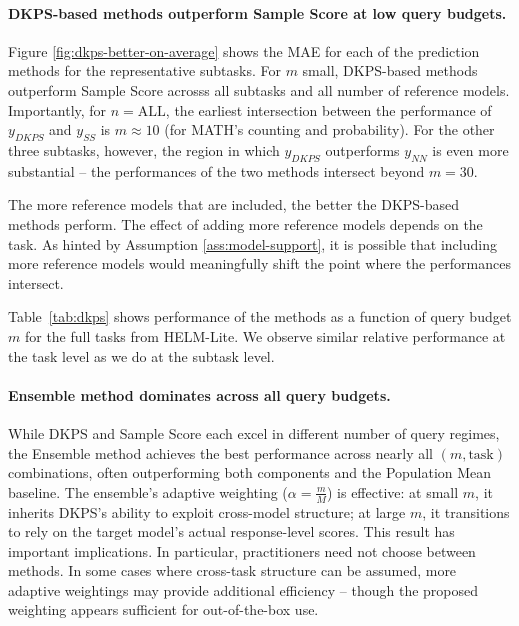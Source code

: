 \paragraph{DKPS-based methods outperform Sample Score at low query budgets.}
Figure \ref{fig:dkps-better-on-average} shows the MAE for each of the prediction methods for the representative subtasks.
For $ m $ small, DKPS-based methods outperform Sample Score acrosss all subtasks and all number of reference models.
Importantly, for $ n = \text{ALL} $, the earliest intersection between the performance of $ y_{DKPS} $ and $ y_{SS} $ is $ m \approx 10 $ (for MATH's counting and probability).
For the other three subtasks, however, the region in which $ y_{DKPS} $ outperforms $ y_{NN} $ is even more substantial -- the performances of the two methods intersect beyond $ m = 30 $.

The more reference models that are included, the better the DKPS-based methods perform.
The effect of adding more reference models depends on the task.
As hinted by Assumption \ref{ass:model-support}, it is possible that including more reference models would meaningfully shift the point where the performances intersect.

Table~\ref{tab:dkps} shows performance of the methods as a function of query budget $ m $ for the full tasks from HELM-Lite.
We observe similar relative performance at the task level as we do at the subtask level.

\paragraph{Ensemble method dominates across all query budgets.}
While DKPS and Sample Score each excel in different number of query regimes, the Ensemble method achieves the best performance across nearly all $(m, \text{task})$ combinations, often outperforming both components and the Population Mean baseline.
The ensemble's adaptive weighting ($ \alpha = \frac{m}{M}$) is effective: at small $m$, it inherits DKPS's ability to exploit cross-model structure; at large $m$, it transitions to rely on the target model's actual response-level scores.
This result has important implications.
In particular, practitioners need not choose between methods.
In some cases where cross-task structure can be assumed, more adaptive weightings may provide additional efficiency \citep{math12050746} -- though the proposed weighting appears sufficient for out-of-the-box use.

\hspace{-3cm}
